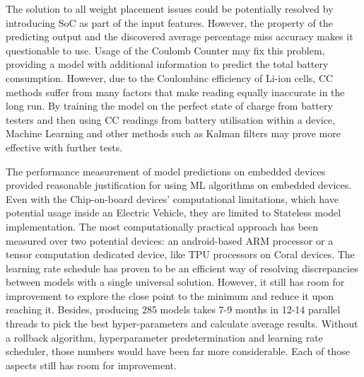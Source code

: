 %
%
The solution to all weight placement issues could be potentially resolved by introducing SoC as part of the input features.
However, the property of the predicting output and the discovered average percentage miss accuracy makes it questionable to use.
Usage of the Coulomb Counter may fix this problem, providing a model with additional information to predict the total battery consumption.
However, due to the Coulombinc efficiency of Li-ion cells, CC methods suffer from many factors that make reading equally inaccurate in the long run.
By training the model on the perfect state of charge from battery testers and then using CC readings from battery utilisation within a device, Machine Learning and other methods such as Kalman filters may prove more effective with further tests.

%
%
 {    
The performance measurement of model predictions on embedded devices provided reasonable justification for using ML algorithms on embedded devices.
Even with the Chip-on-board devices' computational limitations, which have potential usage inside an Electric Vehicle, they are limited to Stateless model implementation.
The most computationally practical approach has been measured over two potential devices: an android-based ARM processor or a tensor computation dedicated device, like TPU processors on Coral devices.
} {
The learning rate schedule has proven to be an efficient way of resolving discrepancies between models with a single universal solution.
However, it still has room for improvement to explore the close point to the minimum and reduce it upon reaching it.
Besides, producing 285 models takes 7-9 months in 12-14 parallel threads to pick the best hyper-parameters and calculate average results.
Without a rollback algorithm, hyperparameter predetermination and learning rate scheduler, those numbers would have been far more considerable.
Each of those aspects still has room for improvement.
}
